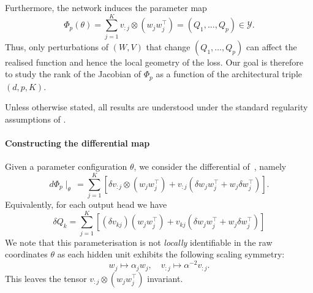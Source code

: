 Furthermore, the network induces the parameter map
\begin{equation}\label{eq: param map}
    \Phi_p(\theta)
    =
    \sum_{j=1}^K v_{:j}\otimes (w_j w_j^\top)
    =
    (Q_1,\dots,Q_p)
    \in \mathcal Y.    
\end{equation}
Thus, only perturbations of $(W,V)$ that change $(Q_1,\dots,Q_p)$ can affect the realised function and hence the local geometry of the loss. 
Our goal is therefore to study the rank of the Jacobian of $\Phi_p$ as a function of the architectural triple $(d,p,K)$.

Unless otherwise stated, all results are understood under the standard regularity assumptions of \citet[Theorem~7.1]{watanabe2009slt}.

\paragraph{Constructing the differential map} Given a parameter configuration $\theta$, we consider the differential of~, namely
\begin{equation}\label{eq: differential map}
    d \Phi_{p}\mid_{\theta} \, = \sum_{j=1}^{K} \left[ \delta v_{:j} \otimes (w_{j}w_{j}^{\top}) + v_{:j}\left( \delta w_{j} w_{j}^{\top} + w_{j} \delta w_{j}^{\top} \right) \right].
\end{equation}
Equivalently, for each output head we have
\begin{equation}
    \delta Q_{k} = \sum_{j=1}^{K} \left[
    (\delta v_{kj})(w_{j}w_{j}^{\top}) + v_{kj} \left( \delta w_{j} w_{j}^{\top} + w_{j} \delta w_{j}^{\top} \right)
    \right]
\end{equation}
We note that this parameterisation is not \textit{locally} identifiable in the raw coordinates $\theta$ as each hidden unit exhibits the following scaling symmetry:
\begin{equation}
    w_{j} \mapsto \alpha_{j}w_{j}, \quad v_{:j} \mapsto \alpha^{-2} v_{:j}.
\end{equation}
This leaves the tensor $v_{:j} \otimes (w_{j} w_{j}^{\top})$ invariant.

